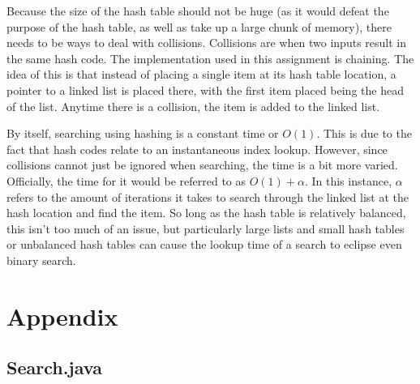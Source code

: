 \documentclass[letterpaper, 10pt,DIV=13]{scrartcl}
\numberwithin{equation}{section} %
\numberwithin{figure}{section} %
\numberwithin{table}{section} %
\begin{document}
Because the size of the hash table should not be huge (as it would defeat the purpose of the hash table, as well as take up a large chunk of memory), there needs to be ways to deal with collisions. Collisions are when two inputs result in the same hash code. The implementation used in this assignment is chaining. The idea of this is that instead of placing a single item at its hash table location, a pointer to a linked list is placed there, with the first item placed being the head of the list. Anytime there is a collision, the item is added to the linked list.

By itself, searching using hashing is a constant time or $O(1)$. This is due to the fact that hash codes relate to an instantaneous index lookup. However, since collisions cannot just be ignored when searching, the time is a bit more varied. Officially, the time for it would be referred to as $O(1) + \alpha$. In this instance, $\alpha$ refers to the amount of iterations it takes to search through the linked list at the hash location and find the item. So long as the hash table is relatively balanced, this isn't too much of an issue, but particularly large lists and small hash tables or unbalanced hash tables can cause the lookup time of a search to eclipse even binary search.

\pagebreak

\section{Appendix}

\subsection{Search.java}
\end{document}
